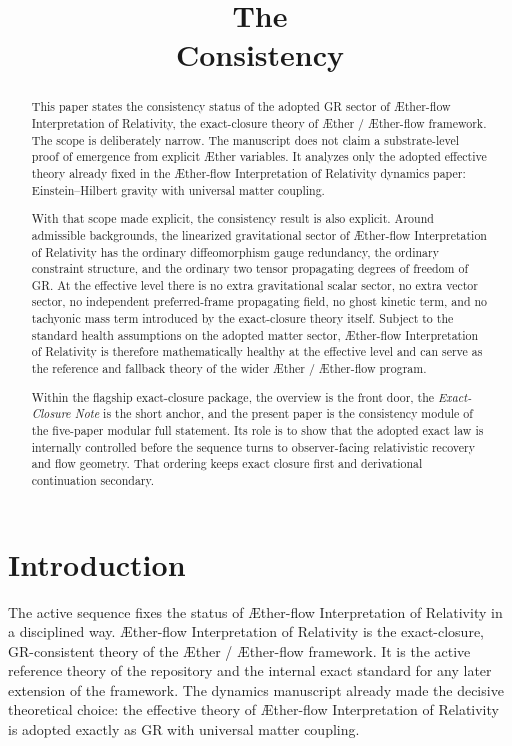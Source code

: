 \documentclass[11pt]{article}
\title{\textbf{The \TheoryName{}}\\[0.4em]
\large Consistency}
\author{}
\date{}
\newcommand{\Aether}{\AE{}ther}
\newcommand{\Aflow}{\AE{}ther-flow}
\newcommand{\TheoryName}{\Aflow{} Interpretation of Relativity}
\newcommand{\TheoryProgram}{\Aether{} / \Aflow{} framework}
\begin{document}
\maketitle

\begin{abstract}
This paper states the consistency status of the adopted GR sector of \TheoryName{}, the exact-closure theory of \TheoryProgram{}. The scope is deliberately narrow. The manuscript does not claim a substrate-level proof of emergence from explicit \Aether{} variables. It analyzes only the adopted effective theory already fixed in the \TheoryName{} dynamics paper: Einstein--Hilbert gravity with universal matter coupling.

With that scope made explicit, the consistency result is also explicit. Around admissible backgrounds, the linearized gravitational sector of \TheoryName{} has the ordinary diffeomorphism gauge redundancy, the ordinary constraint structure, and the ordinary two tensor propagating degrees of freedom of GR. At the effective level there is no extra gravitational scalar sector, no extra vector sector, no independent preferred-frame propagating field, no ghost kinetic term, and no tachyonic mass term introduced by the exact-closure theory itself. Subject to the standard health assumptions on the adopted matter sector, \TheoryName{} is therefore mathematically healthy at the effective level and can serve as the reference and fallback theory of the wider \Aether{} / \Aflow{} program.

Within the flagship exact-closure package, the overview is the front door, the \emph{Exact-Closure Note} is the short anchor, and the present paper is the consistency module of the five-paper modular full statement. Its role is to show that the adopted exact law is internally controlled before the sequence turns to observer-facing relativistic recovery and flow geometry. That ordering keeps exact closure first and derivational continuation secondary.
\end{abstract}

\section{Introduction}

The active sequence fixes the status of \TheoryName{} in a disciplined way. \TheoryName{} is the exact-closure, GR-consistent theory of the \TheoryProgram{}. It is the active reference theory of the repository and the internal exact standard for any later extension of the framework. The dynamics manuscript already made the decisive theoretical choice: the effective theory of \TheoryName{} is adopted exactly as GR with universal matter coupling.
\end{document}
